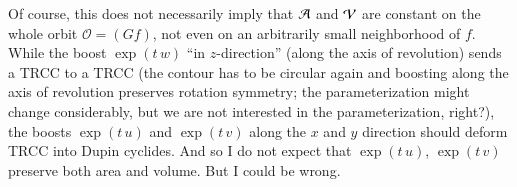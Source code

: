 {Of course, this does not necessarily imply that $\operatorname{\mathcal{A}}$ and $\operatorname{\mathcal{V}}$ are constant on the whole orbit $\mathcal{O} = (G f)$, not even on an arbitrarily small neighborhood of $f$. 
While the boost $\exp(t \, w)$ ``in $z$-direction'' (along the axis of revolution) sends a TRCC to a TRCC (the contour has to be circular again and boosting along the axis of revolution preserves rotation symmetry; the parameterization might change considerably, but we are not interested in the parameterization, right?), the boosts $\exp(t \, u)$ and $\exp(t \, v )$ along the $x$ and $y$ direction should deform TRCC into Dupin cyclides. And so I do not expect that $\exp(t \,u)$, $\exp(t \,v)$ preserve both area and volume. But I could be wrong.
}%

\subsection{}

